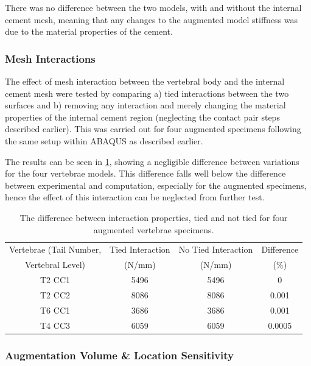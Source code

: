 There was no difference between the two models, with and without the
internal cement mesh, meaning that any changes to the augmented model
stiffness was due to the material properties of the cement.

\subsubsection{Mesh Interactions}\label{mesh-interactions}

The effect of mesh interaction between the vertebral body and the
internal cement mesh were tested by comparing a) tied interactions
between the two surfaces and b) removing any interaction and merely
changing the material properties of the internal cement region
(neglecting the contact pair steps described earlier). This was carried
out for four augmented specimens following the same setup within ABAQUS
as described earlier.

The results can be seen in \cref{tab:meshint}, showing a negligible
difference
between variations for the four vertebrae models. This difference falls
well below the difference between experimental and computation,
especially for the augmented specimens, hence the effect of this
interaction can be neglected from further test.

\begin{table}[ht!]

\caption{The difference between interaction properties, tied and not tied for
four augmented vertebrae specimens.}
\label{tab:meshint}
\centering
  \begin{tabular}{c|c|c|c}
Vertebrae (Tail Number,  & Tied Interaction  & No Tied Interaction  &
Difference \\
Vertebral Level) & (N/mm) & (N/mm) & (\%) \\
\hline
\hline

T2 CC1 &	 5496 &	 5496 &	 0\\
T2 CC2 &	 8086 &	 8086 &	 0.001\\
T6 CC1 &	 3686 &	 3686 &	 0.001\\
T4 CC3 &	 6059 &	 6059 &	 0.0005\\ \hline

\end{tabular}
\end{table}



\subsubsection{Augmentation Volume \& Location Sensitivity}



